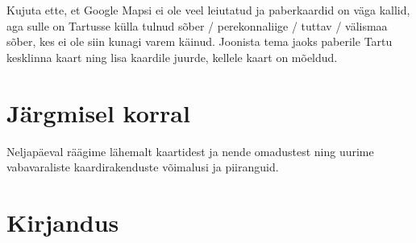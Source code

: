 \documentclass[
]{book}
\begin{document}
Kujuta ette, et Google Mapsi ei ole veel leiutatud ja paberkaardid on väga kallid, aga sulle on Tartusse külla tulnud sõber / perekonnaliige / tuttav / välismaa sõber, kes ei ole siin kunagi varem käinud. Joonista tema jaoks paberile Tartu kesklinna kaart ning lisa kaardile juurde, kellele kaart on mõeldud.

\hypertarget{juxe4rgmisel-korral-1}{%
\section{Järgmisel korral}\label{juxe4rgmisel-korral-1}}

Neljapäeval räägime lähemalt kaartidest ja nende omadustest ning uurime vabavaraliste kaardirakenduste võimalusi ja piiranguid.

\hypertarget{kirjandus-1}{%
\section{Kirjandus}\label{kirjandus-1}}

  
\end{document}
